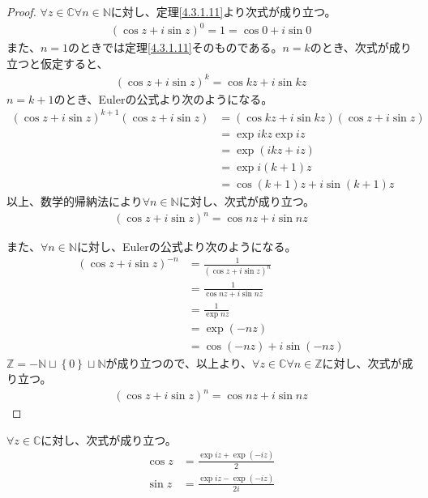 \documentclass[dvipdfmx]{jsarticle}
\begin{document}
\begin{proof}
$\forall z \in \mathbb{C}\forall n \in \mathbb{N}$に対し、定理\ref{4.3.1.11}より次式が成り立つ。
\begin{align*}
\left( \cos z + i\sin z \right)^{0} = 1 = \cos 0 + i\sin 0
\end{align*}
また、$n = 1$のときでは定理\ref{4.3.1.11}そのものである。$n = k$のとき、次式が成り立つと仮定すると、
\begin{align*}
\left( \cos z + i\sin z \right)^{k} = \cos{kz} + i\sin{kz}
\end{align*}
$n = k + 1$のとき、Eulerの公式より次のようになる。
\begin{align*}
\left( \cos z + i\sin z \right)^{k + 1}\left( \cos z + i\sin z \right) &= \left( \cos{kz} + i\sin{kz} \right)\left( \cos z + i\sin z \right)\\
&= \exp{ikz}\exp{iz}\\
&= \exp(ikz + iz)\\
&= \exp{i(k + 1)z}\\
&= \cos{(k + 1)z} + i\sin{(k + 1)z}
\end{align*}
以上、数学的帰納法により$\forall n \in \mathbb{N}$に対し、次式が成り立つ。
\begin{align*}
\left( \cos z + i\sin z \right)^{n} = \cos{nz} + i\sin{nz}
\end{align*}\par
また、$\forall n \in \mathbb{N}$に対し、Eulerの公式より次のようになる。
\begin{align*}
\left( \cos z + i\sin z \right)^{- n} &= \frac{1}{\left( \cos z + i\sin z \right)^{n}}\\
&= \frac{1}{\cos{nz} + i\sin{nz}}\\
&= \frac{1}{\exp{nz}}\\
&= \exp( - nz)\\
&= \cos( - nz) + i\sin( - nz)
\end{align*}
$\mathbb{Z} = - \mathbb{N} \sqcup \left\{ 0 \right\} \sqcup \mathbb{N}$が成り立つので、以上より、$\forall z \in \mathbb{C}\forall n \in \mathbb{Z}$に対し、次式が成り立つ。
\begin{align*}
\left( \cos z + i\sin z \right)^{n} = \cos{nz} + i\sin{nz}
\end{align*}
\end{proof}
\begin{thm}\label{4.3.1.14} $\forall z \in \mathbb{C}$に対し、次式が成り立つ。
\begin{align*}
\cos z &= \frac{\exp{iz} + \exp( - iz)}{2}\\
\sin z &= \frac{\exp{iz} - \exp( - iz)}{2i}
\end{align*}
\end{thm}
\end{document}
